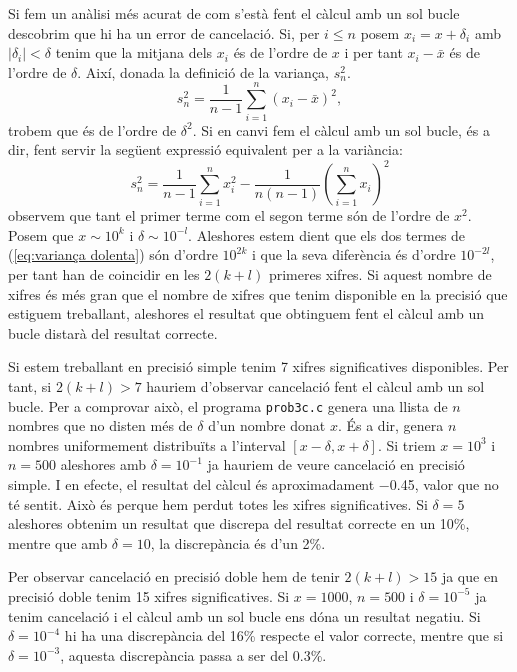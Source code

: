 \documentclass[12pt]{article}
\newcommand{\abs}[1]{\left\lvert#1\right\rvert}
\begin{document}
Si fem un anàlisi més acurat de com s'està fent el càlcul amb un sol bucle descobrim que hi ha un error de cancelació. Si, per \( i \leq n \) posem \( x_i = x + \delta_i \) amb \( \abs{\delta_i} < \delta \) tenim que la mitjana dels \( x_i \) és de l'ordre de \( x \) i per tant \( x_i - \bar{x} \) és de l'ordre de \( \delta \). Així, donada la definició de la variança, \( s_n^2 \).
\begin{equation}
	s_n^2 = \dfrac{1}{n-1}\sum_{i=1}^n (x_i - \bar{x})^2,
\end{equation}
trobem que és de l'ordre de \( \delta^2 \). Si en canvi fem el càlcul amb un sol bucle, és a dir, fent servir la següent expressió equivalent per a la variància:
\begin{equation}
	s_n^2 = \dfrac{1}{n-1} \sum_{i=1}^n x_i^2 - \dfrac{1}{n(n-1)}\left(\sum_{i=1}^n x_i\right)^2 \label{eq:variança dolenta}
\end{equation}
observem que tant el primer terme com el segon terme són de l'ordre de \( x^2 \). Posem que \( x \sim 10^{k} \) i \( \delta \sim 10^{-l} \). Aleshores estem dient que els dos termes de (\ref{eq:variança dolenta}) són d'ordre \( 10^{2k} \) i que la seva diferència és d'ordre \( 10^{-2l} \), per tant han de coincidir en les \( 2(k+l) \) primeres xifres. Si aquest nombre de xifres és més gran que el nombre de xifres que tenim disponible en la precisió que estiguem treballant, aleshores el resultat que obtinguem fent el càlcul amb un bucle distarà del resultat correcte.

Si estem treballant en precisió simple tenim 7 xifres significatives disponibles. Per tant, si \( 2(k+l) > 7 \) hauriem d'observar cancelació fent el càlcul amb un sol bucle. Per a comprovar això, el programa \texttt{prob3c.c} genera una llista de \( n \) nombres que no disten més de \( \delta \) d'un nombre donat \( x \). És a dir, genera \( n \) nombres uniformement distribuïts a l'interval \( [x - \delta, x + \delta] \). Si triem \( x = 10^3 \) i \( n = 500 \) aleshores amb \( \delta = 10^{-1} \) ja hauriem de veure cancelació en precisió simple. I en efecte, el resultat del càlcul és aproximadament \num{-0.45}, valor que no té sentit. Això és perque hem perdut totes les xifres significatives. Si \( \delta = 5 \) aleshores obtenim un resultat que discrepa del resultat correcte en un 10\%, mentre que amb \( \delta = 10 \), la discrepància és d'un 2\%.

Per observar cancelació en precisió doble hem de tenir \( 2(k+l) > 15 \) ja que en precisió doble tenim 15 xifres significatives. Si \( x = 1000 \), \( n = 500 \) i \( \delta = 10^{-5} \) ja tenim cancelació i el càlcul amb un sol bucle ens dóna un resultat negatiu. Si \( \delta = 10^{-4} \) hi ha una discrepància del 16\% respecte el valor correcte, mentre que si \( \delta = 10^{-3} \), aquesta discrepància passa a ser del \num{0.3}\%.
\end{document}
